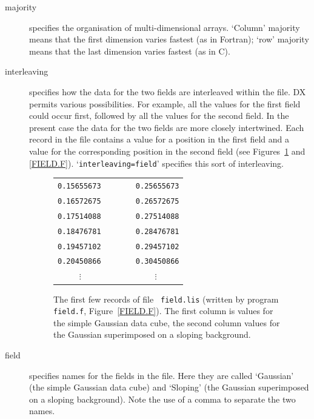 \documentclass[twoside,11pt]{article}
\begin{document}
\begin{enumerate}
\begin{description}
    \item[majority] specifies the organisation of multi-dimensional
     arrays. `Column' majority means that the first dimension varies
     fastest (as in Fortran); `row' majority means that the last
     dimension varies fastest (as in C).

    \item[interleaving] specifies how the data for the two fields are
     interleaved within the file. DX permits various possibilities.
     For example, all the values for the first field could occur
     first, followed by all the values for the second field. In the
     present case the data for the two fields are more closely
     intertwined. Each record in the file contains a value for a
     position in the first field and a value for the corresponding
     position in the second field (see Figures~\ref{GRID_DATA} and
     \ref{FIELD.F}). `{\tt interleaving=field}' specifies this
     sort of interleaving.

    \begin{figure}[htbp]

    \begin{center}
    \begin{tabular}{l}
     {\tt 0.15655673~~~~~~~~0.25655673} \\
     {\tt 0.16572675~~~~~~~~0.26572675}  \\
     {\tt 0.17514088~~~~~~~~0.27514088}  \\
     {\tt 0.18476781~~~~~~~~0.28476781}  \\
     {\tt 0.19457102~~~~~~~~0.29457102}  \\
     {\tt 0.20450866~~~~~~~~0.30450866}  \\
     {\tt ~~~~~$\vdots$~~~~~~~~~~~~~~~~~$\vdots$}  \\
    \end{tabular}
    \end{center}

    \begin{quote}
    \caption[File {\tt field.lis}.]{The first few records of file {\tt
     field.lis} (written by program {\tt field.f},
     Figure~\ref{FIELD.F}). The first column is values for the simple
     Gaussian data cube, the second column values for the Gaussian
     superimposed on a sloping background. \label{GRID_DATA} }
    \end{quote}

    \end{figure}

    \item[field] specifies names for the fields in the file. Here
     they are called `Gaussian' (the simple Gaussian data cube) and
     `Sloping' (the Gaussian superimposed on a sloping background).
     Note the use of a comma to separate the two names.


\end{description}
\end{enumerate}
\end{document}
